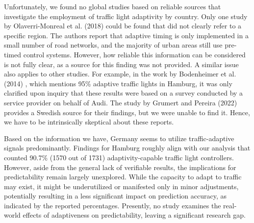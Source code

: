 Unfortunately, we found no global studies based on reliable sources that investigate the employment of traffic light adaptivity by country. Only one study by Olaverri-Monreal et al. (2018) \cite{olaverri-monreal_implementation_2018} could be found that did not clearly refer to a specific region. The authors report that adaptive timing is only implemented in a small number of road networks, and the majority of urban areas still use pre-timed control systems. However, how reliable this information can be considered is not fully clear, as a source for this finding was not provided. A similar issue also applies to other studies. For example, in the work by Bodenheimer et al. (2014) \cite{bodenheimer_enabling_2014}, which mentions 95\% adaptive traffic lights in Hamburg, it was only clarified upon inquiry that these results were based on a survey conducted by a service provider on behalf of Audi. The study by Grumert and Pereira (2022) \cite{grumert_heads-up_2022} provides a Swedish source for their findings, but we were unable to find it. Hence, we have to be intrinsically skeptical about these reports.

Based on the information we have, Germany seems to utilize traffic-adaptive signals predominantly. Findings for Hamburg roughly align with our analysis that counted 90.7\% (1570 out of 1731) adaptivity-capable traffic light controllers. However, aside from the general lack of verifiable results, the implications for predictability remain largely unexplored. While the capacity to adapt to traffic may exist, it might be underutilized or manifested only in minor adjustments, potentially resulting in a less significant impact on prediction accuracy, as indicated by the reported percentages. Presently, no study examines the real-world effects of adaptiveness on predictability, leaving a significant research gap.


